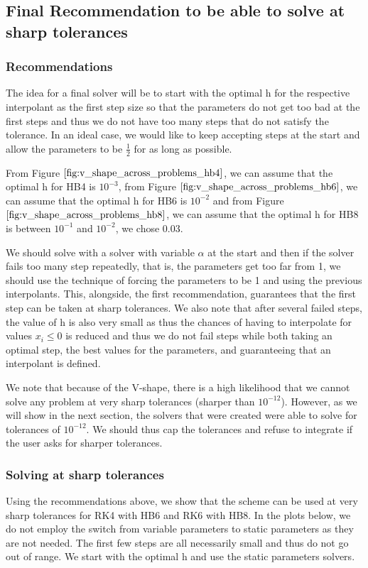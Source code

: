 \documentclass{article}
\begin{document}
\subsection{Final Recommendation to be able to solve at sharp tolerances}
\label{section:HBs_higher_tol}
\subsubsection{Recommendations}
The idea for a final solver will be to start with the optimal h for the respective interpolant as the first step size so that the parameters do not get too bad at the first steps and thus we do not have too many steps that do not satisfy the tolerance. In an ideal case, we would like to keep accepting steps at the start and allow the parameters to be $\frac{1}{2}$ for as long as possible.

From Figure $\ref{fig:v_shape_across_problems_hb4}$, we can assume that the optimal h for HB4 is $10^{-3}$, from Figure $\ref{fig:v_shape_across_problems_hb6}$, we can assume that the optimal h for HB6 is $10^{-2}$ and from Figure $\ref{fig:v_shape_across_problems_hb8}$, we can assume that the optimal h for HB8 is between $10^{-1}$ and $10^{-2}$, we chose $0.03$.

We should solve with a solver with variable $\alpha$ at the start and then if the solver fails too many step repeatedly, that is, the parameters get too far from 1, we should use the technique of forcing the parameters to be 1 and using the previous interpolants. This, alongside, the first recommendation, guarantees that the first step can be taken at sharp tolerances. We also note that after several failed steps, the value of h is also very small as thus the chances of having to interpolate for values $x_i \leq 0$ is reduced and thus we do not fail steps while both taking an optimal step, the best values for the parameters, and guaranteeing that an interpolant is defined. 

We note that because of the V-shape, there is a high likelihood that we cannot solve any problem at very sharp tolerances (sharper than $10^{-12}$). However, as we will show in the next section, the solvers that were created were able to solve for tolerances of $10^{-12}$. We should thus cap the tolerances and refuse to integrate if the user asks for sharper tolerances.

\subsubsection{Solving at sharp tolerances}
Using the recommendations above, we show that the scheme can be used at very sharp tolerances for RK4 with HB6 and RK6 with HB8. In the plots below, we do not employ the switch from variable parameters to static parameters as they are not needed. The first few steps are all necessarily small and thus do not go out of range. We start with the optimal h and use the static parameters solvers. 
\end{document}
